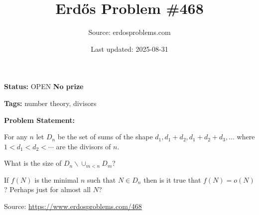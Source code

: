 \documentclass{article}
\title{Erd\H{o}s Problem \#468}
\date{Last updated: 2025-08-31}
\author{Source: erdosproblems.com}
\begin{document}
\maketitle

\noindent\textbf{Status:} OPEN \quad \textbf{No prize}

\noindent\textbf{Tags:} number theory, divisors

\medskip
\noindent\textbf{Problem Statement:}

For any $n$ let $D_n$ be the set of sums of the shape $d_1,d_1+d_2,d_1+d_2+d_3,\ldots$ where $1<d_1<d_2<\cdots$ are the divisors of $n$. 

What is the size of $D_n\backslash \cup_{m<n}D_m$?

If $f(N)$ is the minimal $n$ such that $N\in D_n$ then is it true that $f(N)=o(N)$? Perhaps just for almost all $N$?

\bigskip
\noindent\small{Source: \url{https://www.erdosproblems.com/468}}
\end{document}
